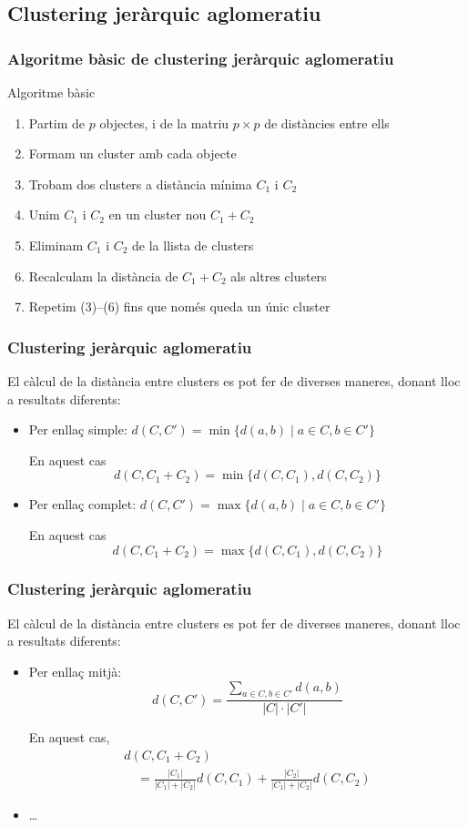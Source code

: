 \documentclass[12pt,t]{beamer}
\renewcommand{\emph}[1]{{\color{red}#1}}
\theoremstyle{plain}
\theoremstyle{definition}
\begin{document}
\subsection{Clustering jeràrquic aglomeratiu}
\begin{frame}
\frametitle{Algoritme bàsic de clustering jeràrquic aglomeratiu}
Algoritme bàsic 

\begin{enumerate}
\item Partim de $p$ objectes, i de la matriu $p\times p$ de \emph{distàncies} entre ells
\item Formam un cluster amb cada objecte
\item Trobam dos clusters a distància mínima $C_1$ i $C_2$
\item Unim $C_1$ i $C_2$ en un cluster nou $C_1+C_2$
\item Eliminam $C_1$ i $C_2$ de la llista de clusters
\item \emph{Recalculam la distància de $C_1+C_2$ als altres clusters}
\item Repetim (3)--(6) fins que només queda un únic cluster
\end{enumerate}


\end{frame}

\begin{frame}
\frametitle{Clustering jeràrquic aglomeratiu}
El càlcul de la distància entre clusters es pot fer de diverses maneres, donant lloc a resultats diferents:
\begin{itemize}
\item Per \emph{enllaç simple}: $d(C,C')=\min\{d(a,b)\mid a\in C,b\in C'\}$
\medskip

En aquest cas
$$
d(C,C_1+ C_2)=\min\{d(C,C_1),d(C,C_2)\}
$$

\item Per \emph{enllaç complet}: $d(C,C')=\max\{d(a,b)\mid a\in C,b\in C'\}$
\medskip

En aquest cas
$$d(C,C_1+ C_2)=\max\{d(C,C_1),d(C,C_2)\}$$
\end{itemize}


\end{frame}

\begin{frame}
\frametitle{Clustering jeràrquic aglomeratiu}
El càlcul de la distància entre clusters es pot fer de diverses maneres, donant lloc a resultats diferents:
\begin{itemize}

\item Per enllaç \emph{mitjà}: 
$$
d(C,C')=\displaystyle\frac{\sum_{a\in C, b\in C'} d(a,b)}{|C|\cdot |C'|}
$$

En aquest cas,
$$
\begin{array}{l}
d(C,C_1+ C_2)\\ \quad =\displaystyle \frac{|C_1|}{|C_1|+|C_2|}d(C,C_1)+\frac{|C_2|}{|C_1|+|C_2|}d(C,C_2)
\end{array}
$$

\item \ldots
\end{itemize}


\end{frame}
\end{document}
